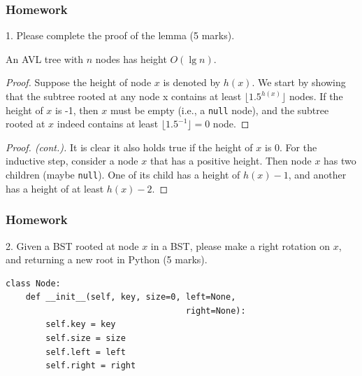 \documentclass[aspectratio=169, 14pt]{beamer}
\begin{document}
\begin{frame}
    \frametitle{Homework}
1. Please complete the proof of the lemma (5 marks).
  \begin{lemma}
    An AVL tree with $n$ nodes has height $O(\lg{n})$. 
    \end{lemma} 
    \begin{proof}
    Suppose the height of node $x$ is denoted by $h(x)$. We start by showing that \alert{the subtree rooted at any node x contains at least $\lfloor 1.5^{h(x)} \rfloor$ nodes}. If the height of $x$ is -1, then $x$ must be empty (i.e., a \texttt{null} node), and the subtree rooted at $x$ indeed contains at least $\lfloor 1.5^{-1} \rfloor = 0$ node.
    \end{proof}
    \end{frame}
    
    \begin{frame}
        \begin{proof}[Proof. (cont.)]
            It is clear it also holds true if the height of $x$ is 0. For the inductive step, consider a node $x$ that has a positive height. Then node $x$ has two children (maybe \texttt{null}). One of its child has a height of $h(x)-1$, and another has a height of at least $h(x) - 2$. 
            
            \end{proof}
    \end{frame}

\begin{frame}[fragile]
    \frametitle{Homework}
2. Given a BST rooted at node $x$ in a BST, please make a right rotation on $x$, and returning a new root in Python (5 marks).

\begin{verbatim}
class Node:
    def __init__(self, key, size=0, left=None, 
                                    right=None):
        self.key = key
        self.size = size
        self.left = left
        self.right = right
\end{verbatim}
\end{frame}
\end{document}

